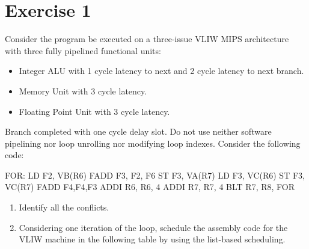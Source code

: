 \section{Exercise 1}

Consider the program be executed on a three-issue VLIW MIPS architecture with three fully pipelined functional units: 
\begin{itemize}
    \item Integer ALU with 1 cycle latency to next and 2 cycle latency to next branch. 
    \item Memory Unit with 3 cycle latency. 
    \item Floating Point Unit with 3 cycle latency.
\end{itemize}
Branch completed with one cycle delay slot.
Do not use neither software pipelining nor loop unrolling nor modifying loop indexes.
Consider the following code: 
\begin{verbnobox}[\verbarg]
FOR:    LD F2, VB(R6)
        FADD F3, F2, F6
        ST F3, VA(R7)
        LD F3, VC(R6)
        ST F3, VC(R7)
        FADD F4,F4,F3
        ADDI R6, R6, 4
        ADDI R7, R7, 4
        BLT R7, R8, FOR
\end{verbnobox}
\begin{enumerate}
    \item Identify all the conflicts. 
    \item Considering one iteration of the loop, schedule the assembly code for the VLIW machine in the following table by using the list-based scheduling.
\end{enumerate}

